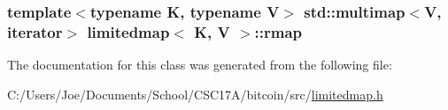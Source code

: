 \subsubsection[{rmap}]{\setlength{\rightskip}{0pt plus 5cm}template$<$typename K, typename V$>$ std\+::multimap$<$V, {\bf iterator}$>$ {\bf limitedmap}$<$ K, V $>$\+::rmap\hspace{0.3cm}{\ttfamily [protected]}}\label{classlimitedmap_ab4a6f5b1572ee3754d53f7773b381eb2}


The documentation for this class was generated from the following file\+:\begin{DoxyCompactItemize}
\item 
C\+:/\+Users/\+Joe/\+Documents/\+School/\+C\+S\+C17\+A/bitcoin/src/\hyperlink{limitedmap_8h}{limitedmap.\+h}\end{DoxyCompactItemize}
